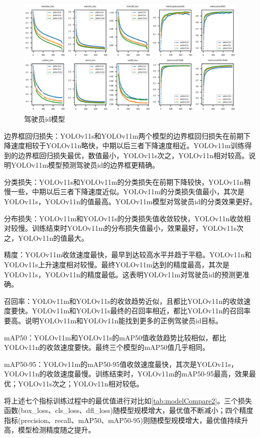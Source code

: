 \begin{figure}[H]
    \centering
    \includegraphics[width=1\textwidth]{figs/chap04/trackResult.png}
    \caption{驾驶员id模型}
    \label{fig:trackResult}
\end{figure}

边界框回归损失：YOLOv11s和YOLOv11m两个模型的边界框回归损失在前期下降速度相较于YOLOv11n略快，中期以后三者下降速度相近。YOLOv11m训练得到的边界框回归损失最优，数值最小，YOLOv11s次之，YOLOv11n相对较高。说明YOLOv11m模型预测驾驶员id的边界框更精确。

分类损失：YOLOv11s和YOLOv11m的分类损失在前期下降较快，YOLOv11n稍慢一些，中期以后三者下降速度近似。YOLOv11m的分类损失值最小，其次是YOLOv11s，YOLOv11n的值最高。YOLOv11m模型对驾驶员id的分类效果更好。

分布损失：YOLOv11m和YOLOv11s的分类损失值收敛较快，YOLOv11n收敛相对较慢。训练结束时YOLOv11m的分布损失值最小，效果最好，YOLOv11s次之，YOLOv11n的值最大。

精度：YOLOv11m收敛速度最快，最早到达较高水平并趋于平稳。YOLOv11n和YOLOv11s上升速度相对较慢。最终YOLOv11m达到的精度最高，其次是YOLOv11s，YOLOv11n的精度最低。这表明YOLOv11m对驾驶员id的预测更准确。

召回率：YOLOv11m和YOLOv11s的收敛趋势近似，且都比YOLOv11n的收敛速度要快。YOLOv11m和YOLOv11s最终的召回率相近，都比YOLOv11n的召回率要高。说明YOLOv11m和YOLOv11n能找到更多的正例驾驶员id目标。

mAP50：YOLOv11m和YOLOv11s的mAP50值收敛趋势比较相似，都比YOLOv11n的收敛速度要快。最终三个模型的mAP50值几乎相同。

mAP50-95：YOLOv11m的mAP50-95值收敛速度最快，其次是YOLOv11s，YOLOv11n的收敛速度最慢。训练结束时，YOLOv11m的mAP50-95最高，效果最优；YOLOv11s次之；YOLOv11n相对较低。

将上述七个指标训练过程中的最优值进行对比如\ref{tab:modelCompare2}。三个损失函数(box\_loss、cls\_loss、dfl\_loss)随模型规模增大，最优值不断减小；四个精度指标(precision、recall、mAP50、mAP50-95)则随模型规模增大，最优值持续升高，模型检测精度随之提升。

